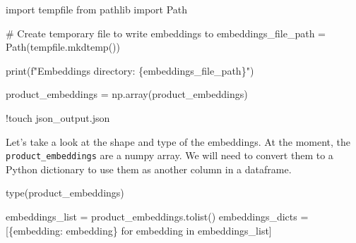 \documentclass[
  letterpaper,
  DIV=11,
  numbers=noendperiod]{scrreprt}
\newenvironment{Shaded}{\begin{snugshade}}{\end{snugshade}}
\newcommand{\BuiltInTok}[1]{\textcolor[rgb]{0.00,0.23,0.31}{#1}}
\newcommand{\CommentTok}[1]{\textcolor[rgb]{0.37,0.37,0.37}{#1}}
\newcommand{\ControlFlowTok}[1]{\textcolor[rgb]{0.00,0.23,0.31}{#1}}
\newcommand{\ImportTok}[1]{\textcolor[rgb]{0.00,0.46,0.62}{#1}}
\newcommand{\KeywordTok}[1]{\textcolor[rgb]{0.00,0.23,0.31}{#1}}
\newcommand{\NormalTok}[1]{\textcolor[rgb]{0.00,0.23,0.31}{#1}}
\newcommand{\OperatorTok}[1]{\textcolor[rgb]{0.37,0.37,0.37}{#1}}
\newcommand{\SpecialCharTok}[1]{\textcolor[rgb]{0.37,0.37,0.37}{#1}}
\newcommand{\SpecialStringTok}[1]{\textcolor[rgb]{0.13,0.47,0.30}{#1}}
\newcommand{\StringTok}[1]{\textcolor[rgb]{0.13,0.47,0.30}{#1}}
\begin{document}
\begin{Shaded}
\begin{Highlighting}[]
\ImportTok{import}\NormalTok{ tempfile}
\ImportTok{from}\NormalTok{ pathlib }\ImportTok{import}\NormalTok{ Path}

\CommentTok{\# Create temporary file to write embeddings to}
\NormalTok{embeddings\_file\_path }\OperatorTok{=}\NormalTok{ Path(tempfile.mkdtemp())}

\BuiltInTok{print}\NormalTok{(}\SpecialStringTok{f"Embeddings directory: }\SpecialCharTok{\{}\NormalTok{embeddings\_file\_path}\SpecialCharTok{\}}\SpecialStringTok{"}\NormalTok{)}
\end{Highlighting}
\end{Shaded}

\begin{Shaded}
\begin{Highlighting}[]
\NormalTok{product\_embeddings }\OperatorTok{=}\NormalTok{ np.array(product\_embeddings)}
\end{Highlighting}
\end{Shaded}

\begin{Shaded}
\begin{Highlighting}[]
\OperatorTok{!}\NormalTok{touch json\_output.json}
\end{Highlighting}
\end{Shaded}

Let's take a look at the shape and type of the embeddings. At the
moment, the \texttt{product\_embeddings} are a numpy array. We will need
to convert them to a Python dictionary to use them as another column in
a dataframe.

\begin{Shaded}
\begin{Highlighting}[]
\BuiltInTok{type}\NormalTok{(product\_embeddings)}
\end{Highlighting}
\end{Shaded}

\begin{Shaded}
\begin{Highlighting}[]
\NormalTok{embeddings\_list }\OperatorTok{=}\NormalTok{ product\_embeddings.tolist()}
\NormalTok{embeddings\_dicts }\OperatorTok{=}\NormalTok{ [\{}\StringTok{\textquotesingle{}embedding\textquotesingle{}}\NormalTok{: embedding\} }\ControlFlowTok{for}\NormalTok{ embedding }\KeywordTok{in}\NormalTok{ embeddings\_list]}
\end{Highlighting}
\end{Shaded}
\end{document}
